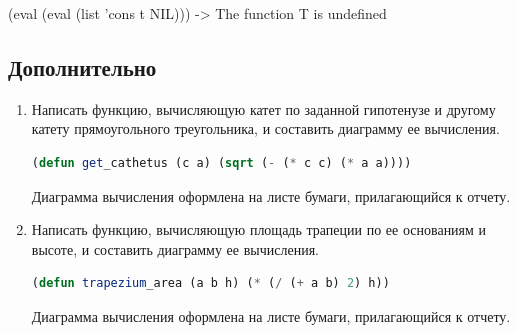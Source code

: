 \documentclass[12pt]{report}
\begin{document}
(eval (eval (list 'cons t NIL))) -> The function T is undefined

\subsection*{Дополнительно}

\begin{enumerate}
	\item  Написать функцию, вычисляющую катет по заданной гипотенузе и другому катету
	прямоугольного треугольника, и составить диаграмму ее вычисления.
	
	\begin{lstlisting}[label=third,caption=Решение задания, language=lisp]
	(defun get_cathetus (c a) (sqrt (- (* c c) (* a a))))
	\end{lstlisting}

	Диаграмма вычисления оформлена на листе бумаги, прилагающийся к отчету.
	
	\item Написать функцию, вычисляющую площадь трапеции по ее основаниям и
	высоте, и составить диаграмму ее вычисления.
	
	\begin{lstlisting}[label=4xxd,caption=Решение задания, language=lisp]
	(defun trapezium_area (a b h) (* (/ (+ a b) 2) h))
	\end{lstlisting}
	
	Диаграмма вычисления оформлена на листе бумаги, прилагающийся к отчету.
\end{enumerate}
\end{document}
